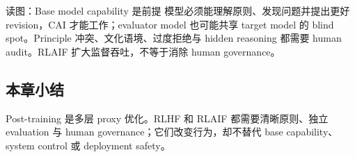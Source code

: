
\begin{knowledgebox}{读图：Base model capability 是前提}
模型必须能理解原则、发现问题并提出更好 revision，CAI 才能工作；evaluator model 也可能共享 target model 的 blind spot。Principle 冲突、文化语境、过度拒绝与 hidden reasoning 都需要 human audit。RLAIF 扩大监督吞吐，不等于消除 human governance。
\end{knowledgebox}


\subsection{本章小结}

Post-training 是多层 proxy 优化。RLHF 和 RLAIF 都需要清晰原则、独立 evaluation 与 human governance；它们改变行为，却不替代 base capability、system control 或 deployment safety。

